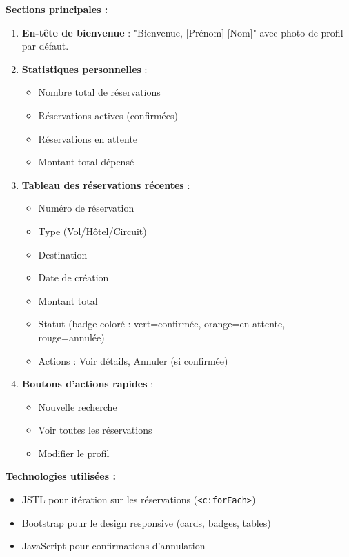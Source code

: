 \documentclass[12pt,a4paper]{report}
\begin{document}
\textbf{Sections principales :}

\begin{enumerate}
    \item \textbf{En-tête de bienvenue} : "Bienvenue, [Prénom] [Nom]" avec photo de profil par défaut.
    
    \item \textbf{Statistiques personnelles} :
    \begin{itemize}
        \item Nombre total de réservations
        \item Réservations actives (confirmées)
        \item Réservations en attente
        \item Montant total dépensé
    \end{itemize}
    
    \item \textbf{Tableau des réservations récentes} :
    \begin{itemize}
        \item Numéro de réservation
        \item Type (Vol/Hôtel/Circuit)
        \item Destination
        \item Date de création
        \item Montant total
        \item Statut (badge coloré : vert=confirmée, orange=en attente, rouge=annulée)
        \item Actions : Voir détails, Annuler (si confirmée)
    \end{itemize}
    
    \item \textbf{Boutons d'actions rapides} :
    \begin{itemize}
        \item Nouvelle recherche
        \item Voir toutes les réservations
        \item Modifier le profil
    \end{itemize}
\end{enumerate}

\textbf{Technologies utilisées :}
\begin{itemize}
    \item JSTL pour itération sur les réservations (\texttt{<c:forEach>})
    \item Bootstrap pour le design responsive (cards, badges, tables)
    \item JavaScript pour confirmations d'annulation
\end{itemize}
\end{document}
